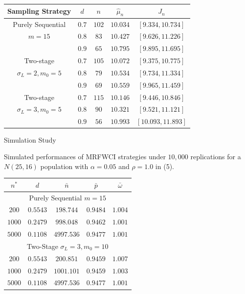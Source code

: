 \documentclass [xcolor=svgnames, t] {beamer}
\begin{document}
\begin{frame}{}
    \vspace{8mm}
    \begin{center}
\begin{tabular}{c c c c c} 
 \hline
 Sampling Strategy & $d$ & $n$ & $\hat{\mu}_n$ & $J_n$  \\  
 \hline
{Purely Sequential}  & $0.7$ & $102$ & $10.034$ & $[9.334,10.734]$  \\ 
 $m=15$ & $0.8$ & $83$ & $10.427$ & $[9.626,11.226]$ \\
  & $0.9$ & $65$ & $10.795$ & $[9.895,11.695]$\\
 \hline
{Two-stage }  & $0.7$ & $105$ &$10.072$ & $[9.375,10.775]$  \\ 
 $\sigma_L=2,m_0=5$ & $0.8$ & $79$ & $10.534$ & $[9.734,11.334]$ \\
  & $0.9$ & $69$ & $10.559$ & $[9.965,11.459]$\\
 \hline
{Two-stage }  & $0.7$ & $115$ & $10.146$ & $[9.446,10.846]$  \\ 
 $\sigma_L=3,m_0=5$ & $0.8$ & $90$ & $10.321$ & $[9.521,11.121]$ \\
  & $0.9$ & $56$ & $10.993$ & $[10.093,11.893]$\\
 \hline
\end{tabular}
\end{center}
\end{frame}
\begin{frame}{Simulation Study}

Simulated performances of  MRFWCI strategies under $10,000$ replications for a $N(25,16)$ population with $\alpha=0.05$ and $\rho=1.0$ in (5).
 \begin{center}
\begin{tabular}{c c c c c} 
 \hline
 $n^*$ & $d$ & $\bar{n}$ & $\bar{p}$ & $\bar{\omega}$\\
 \hline
 \multicolumn{5}{c}{Purely Sequential $m=15$}\\
  \hline
 $200$ & $0.5543$ & $198.744$ & $0.9484$  & $1.004$\\ 
 $1000$ & $0.2479$ & $998.048$ & $0.9462$ & $1.001$ \\ 
  $5000$ & $0.1108$ & $4997.536$ & $0.9477$ & $1.001$ \\ 
  \hline
\multicolumn{5}{c}{Two-Stage $\sigma_L=3, m_0=10$}\\
 \hline
 $200$ & $0.5543$ & $200.851$ & $0.9459$ & $1.007$ \\ 
 $1000$ & $0.2479$ & $1001.101$ & $0.9459$  & $1.003$\\ 
  $5000$ & $0.1108$ & $4997.536$ & $0.9477$  & $1.001$\\ 
 \hline
\end{tabular}
\end{center}
    
\end{frame}
\end{document}
